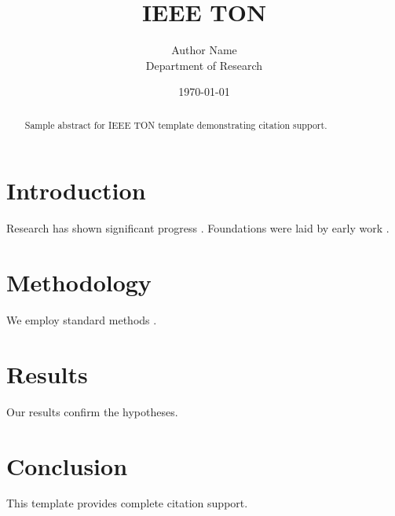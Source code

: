 ﻿\documentclass{IEEEtran}
\title{IEEE TON}
\author{Author Name \\ \small Department of Research}
\date{\today}
\begin{document}
\maketitle

\begin{abstract}
Sample abstract for IEEE TON template demonstrating citation support.
\end{abstract}

\section{Introduction}
Research has shown significant progress \citep{einstein1905}. Foundations were laid by early work \citep{turing1950}.

\section{Methodology}
We employ standard methods \citep{knuth1984}.

\section{Results}
Our results confirm the hypotheses.

\section{Conclusion}
This template provides complete citation support.



\end{document}
